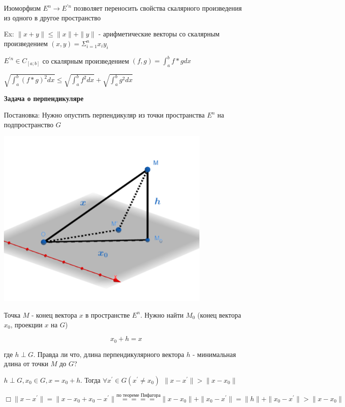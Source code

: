 \documentclass[12pt]{article}
\begin{document}
    \tableofcontents
    \clearpage

    
    \Nota Изоморфизм $\displaystyle E^n \rightarrow E^{\prime n}$ позволяет переносить свойства скалярного произведения
    из одного в другое пространство

    Ex: $\|x + y\| \leq \|x\| + \|y\|$ - арифметические векторы со скалярным произведением $\displaystyle (x, y) = \Sigma^n_{i=1} x_i y_i$

    $\displaystyle E^{\prime n} \in C_{[a;b]}$ со скалярным произведением $\displaystyle (f, g) = \int^b_a f * g dx$

    $\displaystyle \sqrt{\int^b_a (f * g)^2 dx} \leq \sqrt{\int^b_a f^2 dx} + \sqrt{\int^b_a g^2 dx}$

    \textbf{Задача о перпендикуляре}

    Постановка: Нужно опустить перпендикуляр из точки пространства $\displaystyle E^n$ на подпространство $G$

    \includegraphics[height=90mm]{images/specsec_2024_03_01_1}

    Точка $M$ - конец вектора $x$ в пространстве $\displaystyle E^n$.
    Нужно найти $\displaystyle M_0$ (конец вектора $\displaystyle x_0$, проекции $x$ на $G$)

    \[x_0 + h = x\]

    где $h \perp G$. Правда ли что, длина перпендикулярного вектора $h$ - минимальная длина от точки $M$ до $G$?

    \Th $\displaystyle h \perp G, x_0 \in G, x = x_0 + h$. Тогда $\displaystyle \forall x^\prime \in G (x^\prime \neq x_0) \ \ \|x - x^\prime\| > \|x - x_0\|$

    $\displaystyle \Box \|x - x^\prime\| = \|x - x_0 + x_0 - x^\prime\| \stackrel{\text{по теореме Пифагора}}{====} \|x - x_0\| + \|x_0 - x^\prime\| = \|h\| + \|x_0 - x^\prime\| > \|x - x_0\|$
\end{document}
